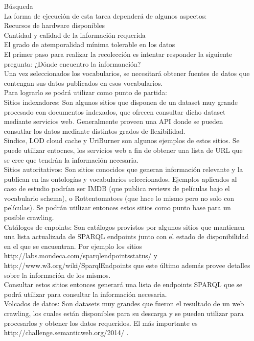 Búsqueda\\
La forma de ejecución de esta tarea dependerá de algunos aspectos:\\
Recursos de hardware disponibles\\
Cantidad y calidad de la información requerida\\
El grado de atemporalidad mínima tolerable en los datos\\
El primer paso para realizar la recolección es intentar responder la siguiente pregunta: ¿Dónde encuentro la informanción?\\
Una vez seleccionados los vocabularios, se necesitará obtener fuentes de datos que contengan sus datos publicados en esos vocabularios.\\ 
Para lograrlo se podrá utilizar como punto de partida:\\
Sitios indexadores: Son algunos sitios que disponen de un dataset muy grande procesado con documentos indexados, que ofrecen consultar dicho 
dataset mediante servicios web. Generalmente proveen una API donde se pueden consutlar los datos mediante distintos grados de flexibilidad.\\
Sindice, LOD cloud cache y UriBurner son algunos ejemplos de estos sitios. Se puede utilizar entocnes, los servicios web a fin
de obtener una lista de URL que se cree que tendrán la información necesaria.\\
Sitios autoritativos: Son sitios conocidos que generan información relevante y la publican en las ontologías y vocabularios 
seleccionados. Ejemplos aplicados al caso de estudio podrían ser IMDB (que publica reviews de películas bajo el vocabulario schema), o Rottentomatoes
(que hace lo mismo pero no solo con películas). Se podrán utilizar entonces estos sitios como punto base para un posible crawling.\\
Catálogos de enpoints: Son catálogos provistos por algunos sitios que mantienen una lista actualizada de SPARQL endpoints 
junto con el estado de disponibilidad en el que se encuentran. Por ejemplo los sitios http://labs.mondeca.com/sparqlendpointsstatus/ y 
http://www.w3.org/wiki/SparqlEndpoints que este último además provee detalles sobre la información de los mismos.\\
Consultar estos sitios entonces generará una lista de endpoints SPARQL que se podrá utilizar para consultar la información necesaria.\\
Volcados de datos: Son datasets muy grandes que fueron el resultado de un web crawling, los cuales están disponibles para su descarga 
y se pueden utilizar para procesarlos y obtener los datos requeridos. El más importante es http://challenge.semanticweb.org/2014/ .\\